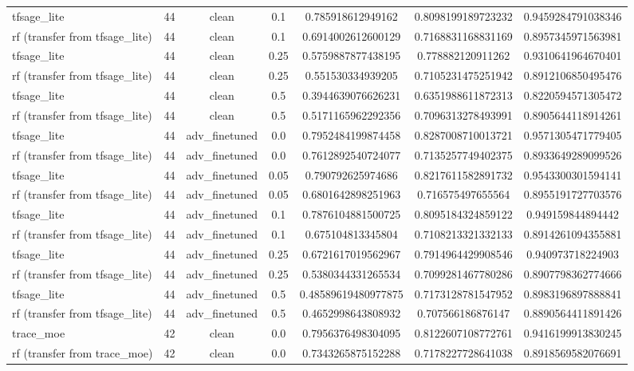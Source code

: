 \begin{table}[htbp]
\begin{tabular}{lcccccc}
tfsage\_lite & 44 & clean & 0.1 & 0.785918612949162 & 0.8098199189723232 & 0.9459284791038346 \\
rf (transfer from tfsage\_lite) & 44 & clean & 0.1 & 0.6914002612600129 & 0.7168831168831169 & 0.8957345971563981 \\
tfsage\_lite & 44 & clean & 0.25 & 0.5759887877438195 & 0.778882120911262 & 0.9310641964670401 \\
rf (transfer from tfsage\_lite) & 44 & clean & 0.25 & 0.551530334939205 & 0.7105231475251942 & 0.8912106850495476 \\
tfsage\_lite & 44 & clean & 0.5 & 0.3944639076626231 & 0.6351988611872313 & 0.8220594571305472 \\
rf (transfer from tfsage\_lite) & 44 & clean & 0.5 & 0.5171165962292356 & 0.7096313278493991 & 0.8905644118914261 \\
tfsage\_lite & 44 & adv\_finetuned & 0.0 & 0.7952484199874458 & 0.8287008710013721 & 0.9571305471779405 \\
rf (transfer from tfsage\_lite) & 44 & adv\_finetuned & 0.0 & 0.7612892540724077 & 0.7135257749402375 & 0.8933649289099526 \\
tfsage\_lite & 44 & adv\_finetuned & 0.05 & 0.790792625974686 & 0.8217611582891732 & 0.9543300301594141 \\
rf (transfer from tfsage\_lite) & 44 & adv\_finetuned & 0.05 & 0.6801642898251963 & 0.716575497655564 & 0.8955191727703576 \\
tfsage\_lite & 44 & adv\_finetuned & 0.1 & 0.7876104881500725 & 0.8095184324859122 & 0.949159844894442 \\
rf (transfer from tfsage\_lite) & 44 & adv\_finetuned & 0.1 & 0.675104813345804 & 0.7108213321332133 & 0.8914261094355881 \\
tfsage\_lite & 44 & adv\_finetuned & 0.25 & 0.6721617019562967 & 0.7914964429908546 & 0.940973718224903 \\
rf (transfer from tfsage\_lite) & 44 & adv\_finetuned & 0.25 & 0.5380344331265534 & 0.7099281467780286 & 0.8907798362774666 \\
tfsage\_lite & 44 & adv\_finetuned & 0.5 & 0.48589619480977875 & 0.7173128781547952 & 0.8983196897888841 \\
rf (transfer from tfsage\_lite) & 44 & adv\_finetuned & 0.5 & 0.4652998643808932 & 0.707566186876147 & 0.8890564411891426 \\
trace\_moe & 42 & clean & 0.0 & 0.7956376498304095 & 0.8122607108772761 & 0.9416199913830245 \\
rf (transfer from trace\_moe) & 42 & clean & 0.0 & 0.7343265875152288 & 0.7178227728641038 & 0.8918569582076691 \\

\end{tabular}
\end{table}
